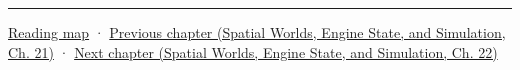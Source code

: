 \begin{center}\rule{0.5\linewidth}{0.5pt}\end{center}

\hyperref[volume-reading-map]{Reading map} · \href{../05-Spatial-Worlds-Engine-State-and-Simulation/main.pdf\#nameddest=06-engine-ii-ch031-spatial-index-serialization-and-query-evidence}{Previous chapter (Spatial Worlds, Engine State, and Simulation, Ch. 21)} · \href{../05-Spatial-Worlds-Engine-State-and-Simulation/main.pdf\#nameddest=06-engine-ii-ch033-versioned-scenes-and-transactional-loading}{Next chapter (Spatial Worlds, Engine State, and Simulation, Ch. 22)}
